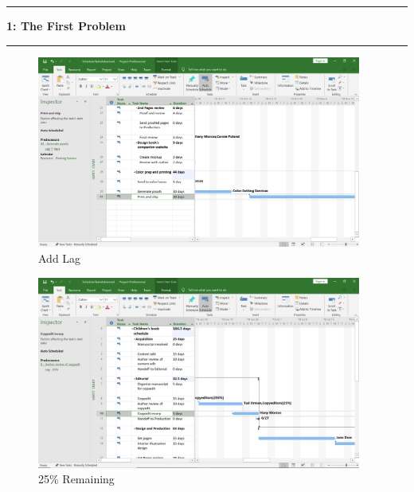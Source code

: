 \documentclass[11pt]{article}
\newcommand\question[2]{\vspace{.25in}\hrule\textbf{#1: #2}\vspace{.5em}\hrule\vspace{.10in}}
\begin{document}
\raggedright
\newcommand\NAME{Yao Xiao}  %
\newcommand\ANDREWID{2019180015}     %
\newcommand\HWNUM{5}              %


\question{1}{The First Problem}

\begin{figure}[H]
    \centering
    \includegraphics[width=0.95\textwidth]{lag}
    \caption{Add Lag}
\end{figure}
\begin{figure}[H]
    \centering
    \includegraphics[width=0.95\textwidth]{percent}
    \caption{25\% Remaining}
\end{figure}
\end{document}

